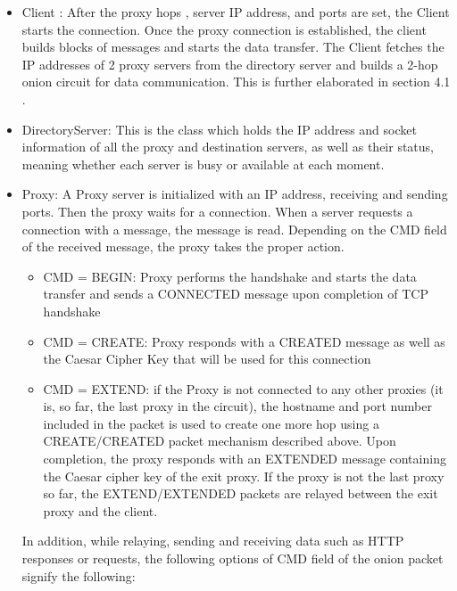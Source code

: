 \documentclass{article}
\begin{document}
\begin{itemize}
\item Client : After the proxy hops , server IP address, and ports are set, the Client starts the connection. Once the proxy connection is established, the client builds blocks of messages and starts the data transfer. The Client fetches the IP addresses of 2 proxy servers from the directory server and builds a 2-hop onion circuit for data communication. This is further elaborated in section 4.1 .\\
\item DirectoryServer: This is the class which holds the IP address and socket information of all the proxy and destination servers, as well as their status, meaning whether each server is busy or available at each moment. \\
\item Proxy: A Proxy server is initialized with an IP address, receiving and sending ports. Then the proxy waits for a connection. When a server requests a connection with a message, the message is read. Depending on the CMD field of the received message, the proxy takes the proper action. \\
\begin {itemize}
\item CMD = BEGIN: Proxy performs the handshake and starts the data transfer and sends a CONNECTED message upon completion of TCP handshake \\
\item CMD = CREATE: Proxy responds with a CREATED message as well as the Caesar Cipher Key that will be used for this connection \\
\item CMD = EXTEND: if the Proxy is not connected to any other proxies (it is, so far, the last proxy in the circuit), the hostname and port number included in the packet is used to create one more hop using a CREATE/CREATED packet mechanism described above. Upon completion, the proxy  responds with an EXTENDED message containing the Caesar cipher key of the exit proxy. If the proxy is not the last proxy so far, the EXTEND/EXTENDED packets are relayed between the exit proxy and the client. \\
\end{itemize}
In addition, while relaying, sending and receiving data such as HTTP responses or requests, the following  options of CMD field of the onion packet signify the following: \\
\begin {itemize}

\end{itemize}
\end{itemize}
\end{document}
